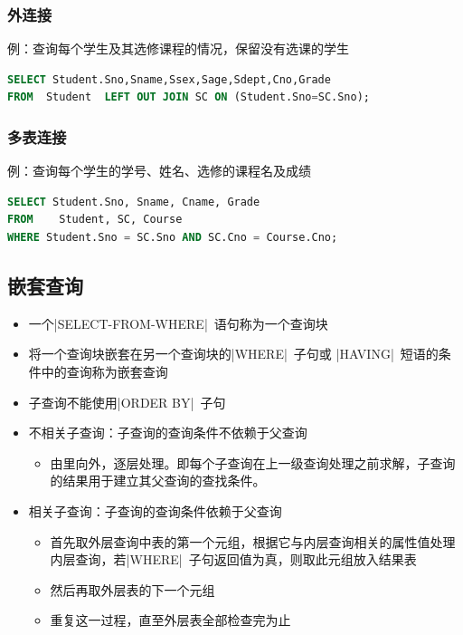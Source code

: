 \subsubsection{外连接}
例：查询每个学生及其选修课程的情况，保留没有选课的学生
\begin{lstlisting}[language=sql]
SELECT Student.Sno,Sname,Ssex,Sage,Sdept,Cno,Grade
FROM  Student  LEFT OUT JOIN SC ON (Student.Sno=SC.Sno); 
\end{lstlisting}

\subsubsection{多表连接}
例：查询每个学生的学号、姓名、选修的课程名及成绩
\begin{lstlisting}[language=sql]
SELECT Student.Sno, Sname, Cname, Grade
FROM    Student, SC, Course
WHERE Student.Sno = SC.Sno AND SC.Cno = Course.Cno;
\end{lstlisting}

\subsection{嵌套查询}
\begin{itemize}
    \item 一个\sverb|SELECT-FROM-WHERE|\ 语句称为一个查询块
    \item 将一个查询块嵌套在另一个查询块的\sverb|WHERE|\ 子句或 \sverb|HAVING|\ 短语的条件中的查询称为嵌套查询
    \item 子查询不能使用\sverb|ORDER BY|\ 子句
    \item 不相关子查询：子查询的查询条件不依赖于父查询
    \begin{itemize}
        \item 由里向外，逐层处理。即每个子查询在上一级查询处理之前求解，子查询的结果用于建立其父查询的查找条件。
    \end{itemize}
      \item 相关子查询：子查询的查询条件依赖于父查询
      \begin{itemize}
        \item 首先取外层查询中表的第一个元组，根据它与内层查询相关的属性值处理内层查询，若\sverb|WHERE|\ 子句返回值为真，则取此元组放入结果表
        \item 然后再取外层表的下一个元组
        \item 重复这一过程，直至外层表全部检查完为止
      \end{itemize}
\end{itemize}

